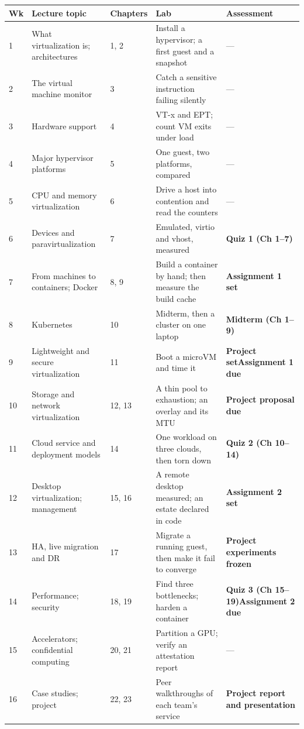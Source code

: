 \begin{longtable}{@{}L{1.1cm}L{3.2cm}L{1.8cm}L{4.4cm}L{3.9cm}@{}}
\toprule
{}
\textbf{Wk} & \textbf{Lecture topic} & \textbf{Chapters} & \textbf{Lab} &
\textbf{Assessment} \\
\midrule
{} & What virtualization is; architectures & 1, 2 & Install a hypervisor; a
first guest and a snapshot & --- \\
2 & The virtual machine monitor & 3 & Catch a sensitive instruction failing
silently & --- \\
3 & Hardware support & 4 & VT-x and EPT; count VM exits under load & --- \\
4 & Major hypervisor platforms & 5 & One guest, two platforms, compared & --- \\
5 & CPU and memory virtualization & 6 & Drive a host into contention and read
the counters & --- \\
6 & Devices and paravirtualization & 7 & Emulated, virtio and vhost, measured &
\textbf{Quiz 1 (Ch 1--7)} \\
7 & From machines to containers; Docker & 8, 9 & Build a container by hand;
then measure the build cache & \textbf{Assignment 1 set} \\
8 & Kubernetes & 10 & Midterm, then a cluster on one laptop &
\textbf{Midterm (Ch 1--9)} \\
9 & Lightweight and secure virtualization & 11 & Boot a microVM and time it &
\textbf{Project set}\newline \textbf{Assignment 1 due} \\
10 & Storage and network virtualization & 12, 13 & A thin pool to exhaustion;
an overlay and its MTU & \textbf{Project proposal due} \\
11 & Cloud service and deployment models & 14 & One workload on three clouds,
then torn down & \textbf{Quiz 2 (Ch 10--14)} \\
12 & Desktop virtualization; management & 15, 16 & A remote desktop measured;
an estate declared in code & \textbf{Assignment 2 set} \\
13 & HA, live migration and DR & 17 & Migrate a running guest, then make it
fail to converge & \textbf{Project experiments frozen} \\
14 & Performance; security & 18, 19 & Find three bottlenecks; harden a
container & \textbf{Quiz 3 (Ch 15--19)}\newline \textbf{Assignment 2 due} \\
15 & Accelerators; confidential computing & 20, 21 & Partition a GPU; verify an
attestation report & --- \\
16 & Case studies; project & 22, 23 & Peer walkthroughs of each team's service
& \textbf{Project report and presentation} \\
\bottomrule
\end{longtable}

